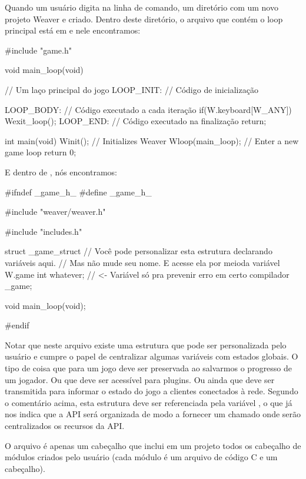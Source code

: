 

Quando um usuário digita  na linha de
comando, um diretório com um novo projeto Weaver e criado. Dentro
deste diretório, o arquivo que contém o loop principal está
em  e nele encontramos:

\alinhaverbatim
#include "game.h"

void main_loop(void){ // Um laço principal do jogo
 LOOP_INIT: // Código de inicialização 

 LOOP_BODY: // Código executado a cada iteração
    if(W.keyboard[W_ANY])
        Wexit_loop();
 LOOP_END: // Código executado na finalização
    return;
}

int main(void){
  Winit(); // Initializes Weaver
  Wloop(main_loop); // Enter a new game loop
  return 0;
}
\alinhanormal

E dentro de , nós encontramos:

\linha
\alinhaverbatim
#ifndef _game_h_
#define _game_h_

#include "weaver/weaver.h"

#include "includes.h"

struct _game_struct{
  // Você pode personalizar esta estrutura declarando variáveis aqui.
  // Mas não mude seu nome. E acesse ela por meioda variável W.game
  int whatever; // <- Variável só pra prevenir erro em certo compilador
} _game;

void main_loop(void);

#endif
\alinhanormal
\linha

Notar que neste arquivo existe uma estrutura que pode ser
personalizada pelo usuário e cumpre o papel de centralizar algumas
variáveis com estados globais. O tipo de coisa que para um jogo deve
ser preservada ao salvarmos o progresso de um jogador. Ou que deve ser
acessível para plugins. Ou ainda que deve ser transmitida para
informar o estado do jogo a clientes conectados à rede. Segundo o
comentário acima, esta estrutura deve ser referenciada pela
variável , o que já nos indica que a API será
organizada de modo a fornecer um 
chamado  onde serão centralizados os recursos da API.

O arquivo  é apenas um cabeçalho que inclui em
um projeto todos os cabeçalho de módulos criados pelo usuário (cada
módulo é um arquivo de código C e um cabeçalho).

